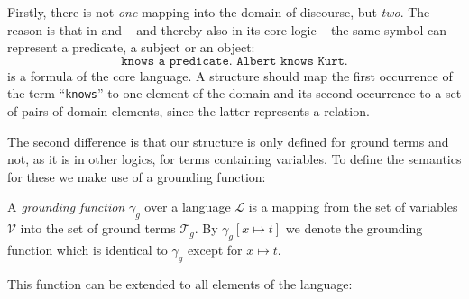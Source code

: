 Firstly, there is not \emph{one} mapping into the domain of discourse, but \emph{two}. The reason is that in \rdf and \nthree -- and thereby also in its core logic -- the 
same symbol 
can represent a predicate, a subject or an object:
\[
 \texttt{knows a predicate. Albert knows Kurt.}
\]
is a formula of the core language. A structure should map the first occurrence of the term ``\texttt{knows}'' to one element of the domain and its second occurrence to 
a set of pairs of domain elements, since the latter 
represents a relation. 

The second difference is that our structure is only defined for ground terms and not, as it is in other logics, for terms containing variables. 
To define the semantics for these we make use of a grounding function:


\begin{definition}
A \emph{grounding function} $\gamma_g$ over a language $\mathcal{L}$ is a mapping from the set of variables $\mathcal{V}$ %
into the set of ground terms $\mathcal{T}_g$. %
By $\gamma_g [x\mapsto t]$ 
 we denote the grounding function which is identical to $\gamma_g$ except for $x\mapsto t$. 
\end{definition}

This function can be extended to all elements of the language:

